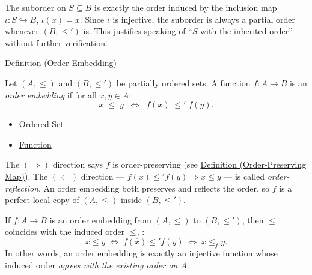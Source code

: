 \begin{remark*}
The suborder on $S \subseteq B$ is exactly the order induced by the
inclusion map $\iota : S \hookrightarrow B$, $\iota(x) = x$. Since $\iota$
is injective, the suborder is always a partial order whenever $(B,\leq')$
is. This justifies speaking of ``$S$ with the inherited order'' without
further verification.
\end{remark*}


\begin{definitionbox}{Definition (Order Embedding)}
\begin{definition}\label{def:order-embedding}
Let $(A, \leq)$ and $(B, \leq')$ be partially ordered sets. A function
$f : A \to B$ is an \emph{order embedding} if for all $x, y \in A$:
\[
x \;\leq\; y
\;\;\Longleftrightarrow\;\;
f(x) \;\leq'\; f(y).
\]
\end{definition}
\end{definitionbox}

\begin{dependencies}
\begin{itemize}
  \item \hyperref[def:ordered-set]{Ordered Set}
  \item \hyperref[def:function]{Function}
\end{itemize}
\end{dependencies}

\begin{remark*}
The $(\Rightarrow)$ direction says $f$ is order-preserving
(see \hyperref[def:order-pres]{Definition (Order-Preserving Map)}). The
$(\Leftarrow)$ direction --- $f(x) \leq' f(y) \Rightarrow x \leq y$ ---
is called \emph{order-reflection}. An order embedding both preserves and
reflects the order, so $f$ is a perfect local copy of $(A,\leq)$ inside
$(B,\leq')$.
\end{remark*}

\begin{remark*}
If $f : A \to B$ is an order embedding from $(A, \leq)$ to $(B, \leq')$,
then $\leq$ coincides with the induced order $\leq_f$:
\[
x \leq y \;\Longleftrightarrow\; f(x) \leq' f(y) \;\Longleftrightarrow\; x \leq_f y.
\]
In other words, an order embedding is exactly an injective function whose
induced order \emph{agrees with the existing order on $A$}.
\end{remark*}

